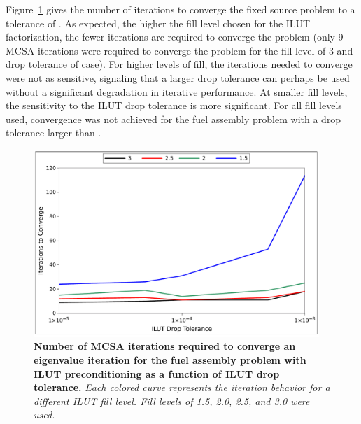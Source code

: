 Figure~\ref{fig:ilut_iterations} gives the number of iterations to
converge the fixed source problem to a tolerance of . As
expected, the higher the fill level chosen for the ILUT factorization,
the fewer iterations are required to converge the problem (only 9 MCSA
iterations were required to converge the problem for the fill level of
3 and drop tolerance of  case). For higher levels of fill,
the iterations needed to converge were not as sensitive, signaling
that a larger drop tolerance can perhaps be used without a significant
degradation in iterative performance. At smaller fill levels, the
sensitivity to the ILUT drop tolerance is more significant. For all
fill levels used, convergence was not achieved for the fuel assembly
problem with a drop tolerance larger than .
\begin{figure}[t!]
  \begin{center}
    \includegraphics[width=4.25in]{chapters/spn_equations/ilut_iterations.pdf}
  \end{center}
  \caption{\textbf{Number of MCSA iterations required to converge an
      eigenvalue iteration for the fuel assembly problem with ILUT
      preconditioning as a function of ILUT drop tolerance.}
    \textit{Each colored curve represents the iteration behavior for a
      different ILUT fill level. Fill levels of 1.5, 2.0, 2.5, and 3.0
      were used.}}
  \label{fig:ilut_iterations}
\end{figure}

